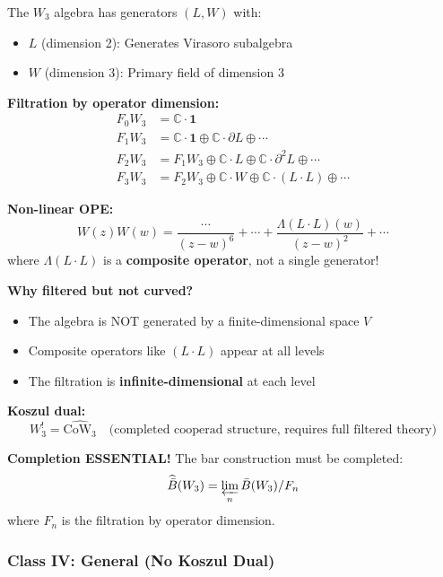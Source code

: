 \begin{example}\label{ex:w3-filtered}
The $W_3$ algebra has generators $(L, W)$ with:
\begin{itemize}
\item $L$ (dimension 2): Generates Virasoro subalgebra
\item $W$ (dimension 3): Primary field of dimension 3
\end{itemize}

\textbf{Filtration by operator dimension:}
\begin{align}
F_0W_3 &= \mathbb{C} \cdot \mathbf{1} \\
F_1W_3 &= \mathbb{C} \cdot \mathbf{1} \oplus \mathbb{C} \cdot \partial L \oplus \cdots \\
F_2W_3 &= F_1W_3 \oplus \mathbb{C} \cdot L \oplus \mathbb{C} \cdot \partial^2 L \oplus \cdots \\
F_3W_3 &= F_2W_3 \oplus \mathbb{C} \cdot W \oplus \mathbb{C} \cdot (L \cdot L) \oplus \cdots
\end{align}

\textbf{Non-linear OPE:}
$$W(z)W(w) = \frac{\cdots}{(z-w)^6} + \cdots + \frac{\Lambda(L \cdot L)(w)}{(z-w)^2} + \cdots$$
where $\Lambda(L \cdot L)$ is a \textbf{composite operator}, not a single generator!

\textbf{Why filtered but not curved?}
\begin{itemize}
\item The algebra is NOT generated by a finite-dimensional space $V$
\item Composite operators like $(L \cdot L)$ appear at all levels
\item The filtration is \textbf{infinite-dimensional} at each level
\end{itemize}

\textbf{Koszul dual:}
$$W_3^! = \widehat{\text{CoW}_3} 
\quad \text{(completed cooperad structure, requires full filtered theory)}$$

\textbf{Completion ESSENTIAL!} The bar construction must be completed:
$$\widehat{\bar{B}}(W_3) = \varprojlim_n \bar{B}(W_3)/F_n$$
where $F_n$ is the filtration by operator dimension.
\end{example}

\subsubsection{Class IV: General (No Koszul Dual)}

